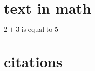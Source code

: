 \documentclass{article}
\begin{document}
\section{text in math}

$ 2+3 \text{ is equal to } 5 $

\section{citations}
\cite[two words]{example2025} %









\end{document}
